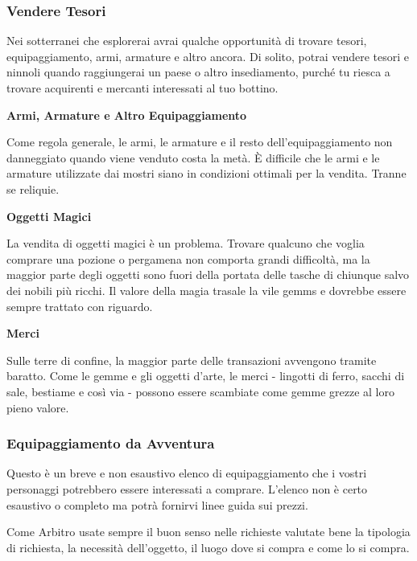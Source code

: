 \documentclass[12pt,a4paper,twoside,openany]{book}
\begin{document}
\begin{multicols}{2}

\subsubsection{Vendere Tesori}

Nei sotterranei che esplorerai avrai qualche opportunità di trovare tesori, equipaggiamento, armi, armature e altro ancora. Di solito, potrai vendere tesori e ninnoli quando raggiungerai un paese o altro insediamento, purché tu riesca a trovare acquirenti e mercanti interessati al tuo bottino.

\medskip

\textbf{Armi, Armature e Altro Equipaggiamento }

Come regola generale, le armi, le armature e il resto dell’equipaggiamento non danneggiato quando viene venduto costa la metà. È difficile che le armi e le armature utilizzate dai mostri siano in condizioni ottimali per la vendita. Tranne se reliquie.

\medskip

\textbf{Oggetti Magici}

La vendita di oggetti magici è un problema. Trovare qualcuno che voglia comprare una pozione o pergamena non comporta grandi difficoltà, ma la maggior parte degli oggetti sono fuori della portata delle tasche di chiunque salvo dei nobili più ricchi. Il valore della magia trasale la vile gemms e dovrebbe essere sempre trattato con riguardo.

\medskip

\textbf{Merci}

Sulle terre di confine, la maggior parte delle transazioni avvengono tramite baratto. Come le gemme e gli oggetti d’arte, le merci - lingotti di ferro, sacchi di sale, bestiame e così via - possono essere scambiate come gemme grezze al loro pieno valore.


\subsubsection{Equipaggiamento da Avventura}

Questo è un breve e non esaustivo elenco di equipaggiamento che i vostri personaggi potrebbero essere interessati a comprare. L'elenco non è certo esaustivo o completo ma potrà fornirvi linee guida sui prezzi.

Come Arbitro usate sempre il buon senso nelle richieste valutate bene la tipologia di richiesta, la necessità dell'oggetto, il luogo dove si compra e come lo si compra.


\end{multicols}
\end{document}

